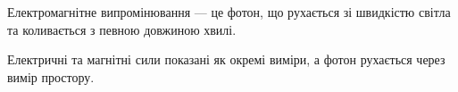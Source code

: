 



Електромагнітне випромінювання --- це фотон, що рухається зі швидкістю світла та коливається з певною довжиною хвилі.

Електричні та магнітні сили показані як окремі виміри, а фотон рухається через вимір простору.
